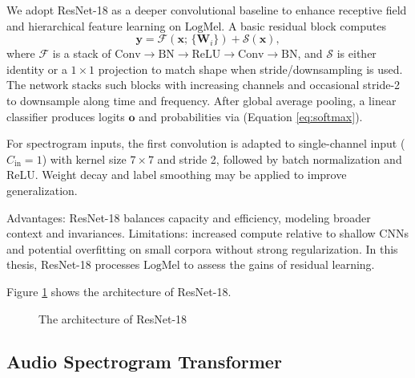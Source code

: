We adopt ResNet-18 as a deeper convolutional baseline to enhance receptive field and hierarchical feature learning on \(\mathrm{LogMel}\). A basic residual block computes
\begin{equation}\label{eq:residual}
\mathbf{y} = \mathcal{F}(\mathbf{x};\, \{\mathbf{W}_i\}) + \mathcal{S}(\mathbf{x}),
\end{equation}
where \(\mathcal{F}\) is a stack of \(\mathrm{Conv}{\to}\mathrm{BN}{\to}\mathrm{ReLU}{\to}\mathrm{Conv}{\to}\mathrm{BN}\), and \(\mathcal{S}\) is either identity or a \(1\!\times\!1\) projection to match shape when stride/downsampling is used. The network stacks such blocks with increasing channels and occasional stride-2 to downsample along time and frequency. After global average pooling, a linear classifier produces logits \(\mathbf{o}\) and probabilities via (Equation \ref{eq:softmax}).

For spectrogram inputs, the first convolution is adapted to single-channel input (\(C_{\text{in}}=1\)) with kernel size \(7\!\times\!7\) and stride 2, followed by batch normalization and ReLU. Weight decay and label smoothing may be applied to improve generalization.

Advantages: ResNet-18 balances capacity and efficiency, modeling broader context and invariances. Limitations: increased compute relative to shallow CNNs and potential overfitting on small corpora without strong regularization. In this thesis, ResNet-18 processes \(\mathrm{LogMel}\) to assess the gains of residual learning.

Figure \ref{fig:resnet_arch} shows the architecture of ResNet-18.

\begin{figure}[h!tbp]
  \centering
  \caption{The architecture of ResNet-18 }
  \label{fig:resnet_arch}
  
\end{figure}

\subsection{Audio Spectrogram Transformer}

